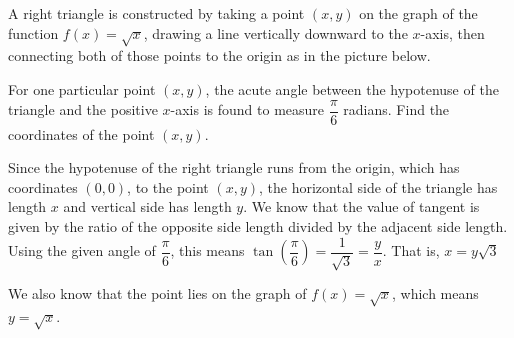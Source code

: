 \documentclass[nooutcomes]{ximera}
\begin{document}
\begin{example}

	A right triangle is constructed by taking a point $(x,y)$ on the graph of the function $f(x)=\sqrt{x}$, drawing a line vertically downward to
	the $x$-axis, then connecting both of those points to the origin as in the picture below. 	\begin{center}
	\end{center}
	For one particular point $(x,y)$, the acute angle between the hypotenuse of the triangle and the positive $x$-axis is found to measure $\dfrac{\pi}{6}$ radians. Find the coordinates of the point $(x,y)$.

	\begin{explanation}

		Since the hypotenuse of the right triangle runs from the origin, which has coordinates $(0,0)$, to the point $(x,y)$, the horizontal side of the triangle has length $x$ and vertical side has length $y$.
		We know that the value of tangent is given by the ratio of the opposite side length divided by the adjacent side length. Using the given angle of $\dfrac{\pi}{6}$, this means 
		$\tan\left(\dfrac{\pi}{6}\right) = \dfrac{1}{\sqrt{3}} = \dfrac{y}{x}$. That is, $x = y\sqrt{3}$ 
		
		We also know that the point lies on the graph of $f(x) = \sqrt{x}$, which means $y = \sqrt{x}$.
		

\end{explanation}
\end{example}
\end{document}
